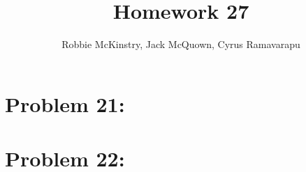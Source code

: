 \documentclass[12pt]{article}
\begin{document}
\title{Homework 27}
\author{Robbie McKinstry, Jack McQuown, Cyrus Ramavarapu}
\renewcommand{\today}{04 November 2016}
\renewcommand{\baselinestretch}{1.5}
\maketitle

\section*{Problem 21: }
\section*{Problem 22: }
\end{document}
